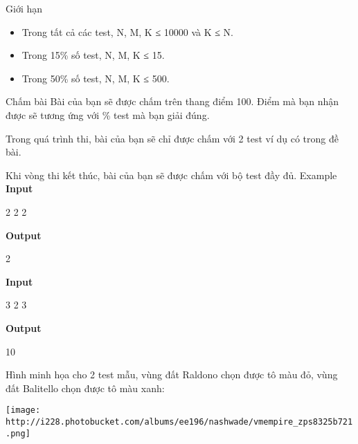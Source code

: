 Giới hạn  
\begin{itemize}
	\item     Trong tất cả các test, N, M, K ≤ 10000 và K ≤ N.   
	\item     Trong 15\% số test, N, M, K ≤ 15.   
	\item     Trong 50\% số test, N, M, K ≤ 500.   
\end{itemize}
   Chấm bài  
Bài của bạn sẽ được chấm trên thang điểm 100. Điểm mà bạn nhận được sẽ tương ứng với \% test mà bạn giải đúng.  

   Trong quá trình thi, bài của bạn sẽ chỉ được chấm với 2 test ví dụ có trong đề bài.  

   Khi vòng thi kết thúc, bài của bạn sẽ được chấm với bộ test đầy đủ.
   Example  
\textbf{    Input   }

   2 2 2  

\textbf{    Output   }

   2  



\textbf{    Input   }

   3 2 3   \textbf{
\\}

\textbf{    Output   }

   10   \textbf{
\\}



   Hình minh họa cho 2 test mẫu, vùng đất Raldono chọn được tô màu đỏ, vùng đất Balitello chọn được tô màu xanh:   \textbf{
\\}


\texttt{[image: http://i228.photobucket.com/albums/ee196/nashwade/vmempire\_zps8325b721.png]}